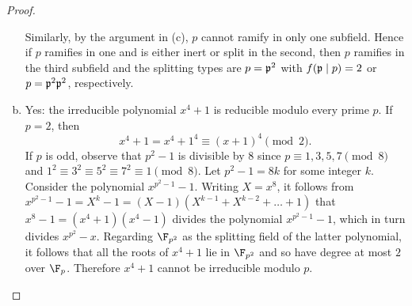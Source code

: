 \documentclass[10pt]{amsart}
\begin{document}
\begin{thm}
\begin{proof}
\begin{enumerate}[(a)]
        Similarly, by the argument in (c), $p$ cannot ramify in only one subfield.
        Hence if $p$ ramifies in one and is either inert or split in the second, then $p$ ramifies in the third subfield and the splitting types are $p = \mathfrak{p}^2$ with $f(\mathfrak{p} \mid p) = 2$ or $p = \mathfrak{p}^2\mathfrak{p}^2$, respectively.
      \item
        Yes: the irreducible polynomial $x^4 + 1$ is reducible modulo every prime $p$.
        If $p = 2$, then 
        $$x^4 + 1 = x^4 + 1^4 \equiv (x + 1)^4 \pmod{2}.$$
        If $p$ is odd, observe that $p^2 - 1$ is divisible by 8 since $p \equiv 1, 3, 5, 7 \pmod{8}$ and $1^2 \equiv 3^2 \equiv 5^2 \equiv 7^2 \equiv 1 \pmod{8}$.
        Let $p^2 - 1 = 8k$ for some integer $k$.
        Consider the polynomial $x^{p^2 - 1} - 1$.
        Writing $X = x^8$, it follows from $x^{p^2 - 1} - 1 = X^k - 1 = (X - 1)(X^{k - 1} + X^{k - 2} + \ldots + 1)$ that $x^8 - 1 = (x^4 + 1)(x^4 - 1)$ divides the polynomial $x^{p^2 - 1} - 1$, which in turn divides $x^{p^2} - x$.
        Regarding $\F_{p^2}$ as the splitting field of the latter polynomial, it follows that all the roots of $x^4 + 1$ lie in $\F_{p^2}$ and so have degree at most $2$ over $\F_p$.
        Therefore $x^4 + 1$ cannot be irreducible modulo $p$.
    \end{enumerate}
    
  \end{proof}
\end{thm}
\end{document}
